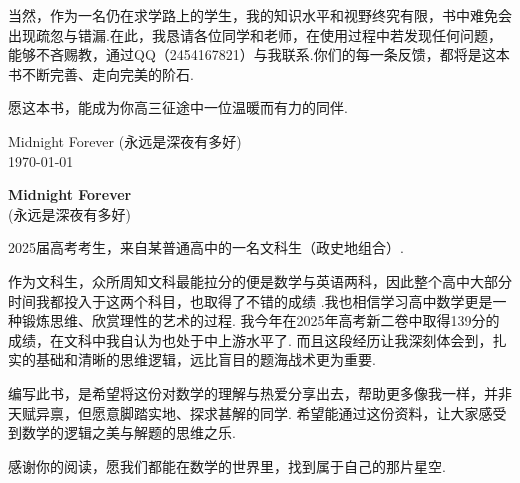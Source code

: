 	当然，作为一名仍在求学路上的学生，我的知识水平和视野终究有限，书中难免会出现疏忽与错漏.在此，我恳请各位同学和老师，在使用过程中若发现任何问题，能够不吝赐教，通过QQ（2454167821）与我联系.你们的每一条反馈，都将是这本书不断完善、走向完美的阶石.
	
	愿这本书，能成为你高三征途中一位温暖而有力的同伴.
	
	\vspace{2cm} 
	\begin{flushright}
		Midnight Forever (永远是深夜有多好) \\
		\today
	\end{flushright}
	
	
	\newpage
	\thispagestyle{empty}
	
	\begin{center}
		\vspace*{4cm} 
		
		
		\vspace{2cm}
		
		\Large \textbf{Midnight Forever} \\
		\large (永远是深夜有多好)
		
		\vspace{1.5cm}
		
		\begin{minipage}{0.8\textwidth}
			\large
			2025届高考考生，来自某普通高中的一名文科生（政史地组合）.
			
			\vspace{0.5cm}
			作为文科生，众所周知文科最能拉分的便是数学与英语两科，因此整个高中大部分时间我都投入于这两个科目，也取得了不错的成绩 .我也相信学习高中数学更是一种锻炼思维、欣赏理性的艺术的过程. 我今年在2025年高考新二卷中取得139分的成绩，在文科中我自认为也处于中上游水平了. 而且这段经历让我深刻体会到，扎实的基础和清晰的思维逻辑，远比盲目的题海战术更为重要.
			
			\vspace{0.5cm}
			编写此书，是希望将这份对数学的理解与热爱分享出去，帮助更多像我一样，并非天赋异禀，但愿意脚踏实地、探求甚解的同学. 希望能通过这份资料，让大家感受到数学的逻辑之美与解题的思维之乐.
			
			\vspace{0.5cm}
			感谢你的阅读，愿我们都能在数学的世界里，找到属于自己的那片星空.
		\end{minipage}
	\end{center}
	
